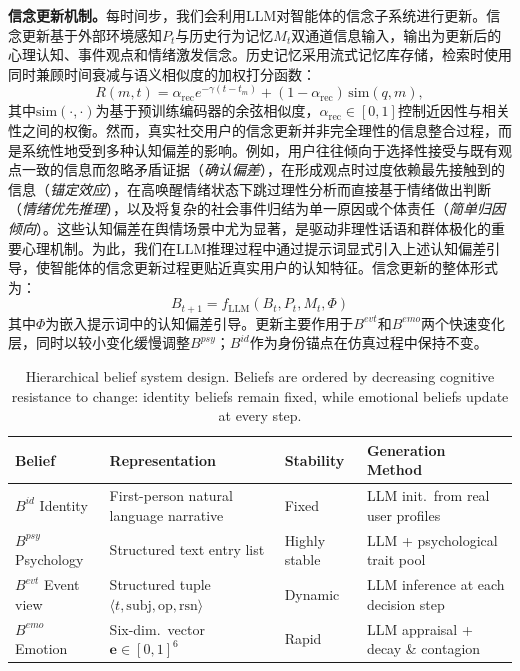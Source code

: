 \documentclass[a4paper,fleqn]{cas-dc}
\begin{document}
\textbf{信念更新机制。}每时间步，我们会利用LLM对智能体的信念子系统进行更新。信念更新基于外部环境感知$P_t$与历史行为记忆$M_t$双通道信息输入，输出为更新后的心理认知、事件观点和情绪激发信念。历史记忆采用流式记忆库存储，检索时使用同时兼顾时间衰减与语义相似度的加权打分函数：
\begin{equation}
R(m, t) = \alpha_{\mathrm{rec}} e^{-\gamma(t - t_m)} + (1-\alpha_{\mathrm{rec}})\,\text{sim}(q, m),
\label{eq:mmr}
\end{equation}
其中$\text{sim}(\cdot,\cdot)$为基于预训练编码器的余弦相似度，$\alpha_{\mathrm{rec}}\in[0,1]$控制近因性与相关性之间的权衡。然而，真实社交用户的信念更新并非完全理性的信息整合过程，而是系统性地受到多种认知偏差的影响。例如，用户往往倾向于选择性接受与既有观点一致的信息而忽略矛盾证据（\textit{确认偏差}），在形成观点时过度依赖最先接触到的信息（\textit{锚定效应}），在高唤醒情绪状态下跳过理性分析而直接基于情绪做出判断（\textit{情绪优先推理}），以及将复杂的社会事件归结为单一原因或个体责任（\textit{简单归因倾向}）。这些认知偏差在舆情场景中尤为显著，是驱动非理性话语和群体极化的重要心理机制。为此，我们在LLM推理过程中通过提示词显式引入上述认知偏差引导，使智能体的信念更新过程更贴近真实用户的认知特征。信念更新的整体形式为：
\begin{equation}
B_{t+1} = f_{\text{LLM}}(B_t, P_t, M_t, \Phi)
\label{eq:belief_update}
\end{equation}
其中$\Phi$为嵌入提示词中的认知偏差引导。更新主要作用于$B^{evt}$和$B^{emo}$两个快速变化层，同时以较小变化缓慢调整$B^{psy}$；$B^{id}$作为身份锚点在仿真过程中保持不变。

\begin{table}[!t]
\centering
\caption{Hierarchical belief system design. Beliefs are ordered by decreasing cognitive resistance to change: identity beliefs remain fixed, while emotional beliefs update at every step.}
\label{tab:belief}
\scriptsize
\renewcommand{\arraystretch}{1.15}
\begin{tabular}{@{}p{1.15cm}p{1.85cm}p{1.05cm}p{2.3cm}@{}}
\toprule
\textbf{Belief} & \textbf{Representation} & \textbf{Stability} & \textbf{Generation Method} \\
\midrule
$B^{id}$ \newline Identity & First-person natural language narrative & Fixed & LLM init.\ from real user profiles \\
\addlinespace
$B^{psy}$ \newline Psychology & Structured text entry list & Highly stable & LLM + psychological trait pool \\
\addlinespace
$B^{evt}$ \newline Event view & Structured tuple $\langle t, \text{subj}, \text{op}, \text{rsn}\rangle$ & Dynamic & LLM inference at each decision step \\
\addlinespace
$B^{emo}$ \newline Emotion & Six-dim.\ vector $\mathbf{e}\!\in\![0,1]^6$ & Rapid & LLM appraisal + decay \& contagion \\
\bottomrule
\end{tabular}
\end{table}
\end{document}
